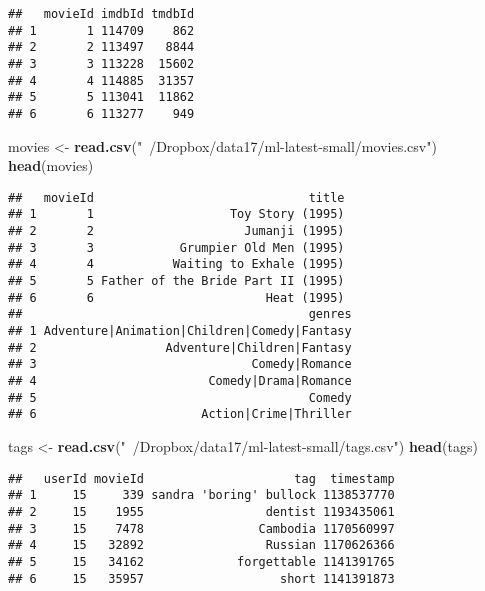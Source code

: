 \documentclass[]{book}
\newenvironment{Shaded}{\begin{snugshade}}{\end{snugshade}}
\newcommand{\KeywordTok}[1]{\textcolor[rgb]{0.13,0.29,0.53}{\textbf{{#1}}}}
\newcommand{\StringTok}[1]{\textcolor[rgb]{0.31,0.60,0.02}{{#1}}}
\newcommand{\NormalTok}[1]{{#1}}
\theoremstyle{definition}
\theoremstyle{definition}
\theoremstyle{definition}
\theoremstyle{remark}
\begin{document}
\begin{verbatim}
##   movieId imdbId tmdbId
## 1       1 114709    862
## 2       2 113497   8844
## 3       3 113228  15602
## 4       4 114885  31357
## 5       5 113041  11862
## 6       6 113277    949
\end{verbatim}

\begin{Shaded}
\begin{Highlighting}[]
\NormalTok{movies <-}\StringTok{ }\KeywordTok{read.csv}\NormalTok{(}\StringTok{"~/Dropbox/data17/ml-latest-small/movies.csv"}\NormalTok{)}
\KeywordTok{head}\NormalTok{(movies)}
\end{Highlighting}
\end{Shaded}

\begin{verbatim}
##   movieId                              title
## 1       1                   Toy Story (1995)
## 2       2                     Jumanji (1995)
## 3       3            Grumpier Old Men (1995)
## 4       4           Waiting to Exhale (1995)
## 5       5 Father of the Bride Part II (1995)
## 6       6                        Heat (1995)
##                                        genres
## 1 Adventure|Animation|Children|Comedy|Fantasy
## 2                  Adventure|Children|Fantasy
## 3                              Comedy|Romance
## 4                        Comedy|Drama|Romance
## 5                                      Comedy
## 6                       Action|Crime|Thriller
\end{verbatim}

\begin{Shaded}
\begin{Highlighting}[]
\NormalTok{tags <-}\StringTok{ }\KeywordTok{read.csv}\NormalTok{(}\StringTok{"~/Dropbox/data17/ml-latest-small/tags.csv"}\NormalTok{)}
\KeywordTok{head}\NormalTok{(tags)}
\end{Highlighting}
\end{Shaded}

\begin{verbatim}
##   userId movieId                     tag  timestamp
## 1     15     339 sandra 'boring' bullock 1138537770
## 2     15    1955                 dentist 1193435061
## 3     15    7478                Cambodia 1170560997
## 4     15   32892                 Russian 1170626366
## 5     15   34162             forgettable 1141391765
## 6     15   35957                   short 1141391873
\end{verbatim}
\end{document}

